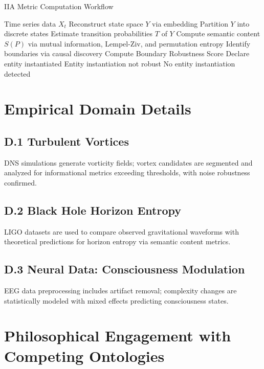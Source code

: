 \documentclass[12pt,a4paper]{article}
\begin{document}
\begin{algorithm}[H]
\caption{IIA Metric Computation Workflow}
\begin{algorithmic}[1]
\Require Time series data $X_t$
\State Reconstruct state space $Y$ via embedding
\State Partition $Y$ into discrete states
\State Estimate transition probabilities $T$ of $Y$
\State Compute semantic content $S(P)$ via mutual information, Lempel-Ziv, and permutation entropy
    \State Identify boundaries via causal discovery
    \State Compute Boundary Robustness Score
        \State Declare entity instantiated
    \Else
        \State Entity instantiation not robust
    \EndIf
\Else
    \State No entity instantiation detected
\EndIf
\end{algorithmic}
\end{algorithm}

\section{Empirical Domain Details}

\subsection{D.1 Turbulent Vortices}

DNS simulations generate vorticity fields; vortex candidates are segmented and analyzed for informational metrics exceeding thresholds, with noise robustness confirmed.

\subsection{D.2 Black Hole Horizon Entropy}

LIGO datasets are used to compare observed gravitational waveforms with theoretical predictions for horizon entropy via semantic content metrics.

\subsection{D.3 Neural Data: Consciousness Modulation}

EEG data preprocessing includes artifact removal; complexity changes are statistically modeled with mixed effects predicting consciousness states.

\section{Philosophical Engagement with Competing Ontologies}
\end{document}
